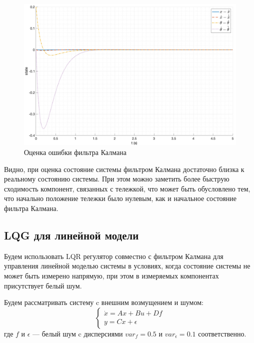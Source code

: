 \begin{figure}[ht!]
    \centering
    \includegraphics[width=\textwidth]{media/plots/kalman/observer_err_1.png}
    \caption{Оценка ошибки фильтра Калмана}
    \label{fig:kalman_filter_err}
\end{figure}
Видно, при оценка состояние системы фильтром Калмана достаточно близка к реальному состоянию системы. При этом 
можно заметить более быструю сходимость компонент, связанных с тележкой, что может быть обусловлено тем, что 
начально положение тележки было нулевым, как и начальное состояние фильтра Калмана. 

\FloatBarrier
\subsection{LQG для линейной модели}
Будем использовать LQR регулятор совместно с фильтром Калмана для управления линейной моделью системы в 
условиях, когда состояние системы не может быть измерено напрямую, при этом в измеряемых компонентах присутствует 
белый шум. 

Будем рассматривать систему c внешним возмущением и шумом: 
\begin{equation}
    \begin{cases}
        \dot{x} = Ax + Bu + Df \\ 
        y = Cx + \epsilon
    \end{cases}
\end{equation}
где $f$ и $\epsilon$ --- белый шум c дисперсиями $var_f = 0.5$ и $var_\epsilon = 0.1$ соответственно.

